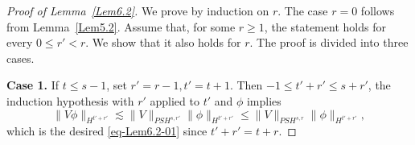 \documentclass{sn-jnl}%
\numberwithin{equation}{section}
\theoremstyle{thmstyleone}%
\theoremstyle{thmstyletwo}%
\theoremstyle{thmstylethree}%
\begin{document}
\begin{proof}[Proof of Lemma~\ref{Lem6.2}]
    We prove by induction on $r$. The case $r = 0$ follows from Lemma~\ref{Lem5.2}. Assume that, for some $r\ge 1$, the statement holds for every $0\le r'<r$. We show that it also holds for $r$.
    The proof is divided into three cases.
    
    \textbf{Case 1.} If $t\leq s-1$, set $r'=r-1, t'=t+1$. Then $-1\leq t'+r'\leq s+r'$, the induction hypothesis with $r'$ applied to $t'$ and $\phi$ implies
    \begin{equation}\label{eq-Lem6.2-02}
        \|V\phi\|_{H^{t'+r'}}\lesssim \|V\|_{PSH^{s,r'}}\|\phi \|_{H^{t'+r'}}\leq \|V\|_{PSH^{s,r}}\|\phi\|_{H^{t'+r'}},
    \end{equation}
    which is the desired \eqref{eq-Lem6.2-01} since $t'+r'=t+r$.
    

\end{proof}
\end{document}
